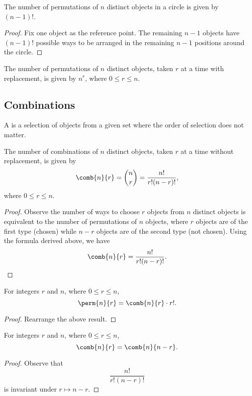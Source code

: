 \begin{proposition}
    The number of permutations of $n$ distinct objects in a circle is given by $(n-1)!$.
\end{proposition}
\begin{proof}
    Fix one object as the reference point. The remaining $n-1$ objects have $(n-1)!$ possible ways to be arranged in the remaining $n-1$ positions around the circle.
\end{proof}

\begin{proposition}
    The number of permutations of $n$ distinct objects, taken $r$ at a time with replacement, is given by $n^r$, where $0 \leq r \leq n$.
\end{proposition}

\subsection{Combinations}

\begin{definition}
    A  is a selection of objects from a given set where the order of selection does not matter.
\end{definition}

\begin{proposition}
    The number of combinations of $n$ distinct objects, taken $r$ at a time without replacement, is given by \[\comb{n}{r} = \binom{n}{r} = \frac{n!}{r! (n-r)!},\] where $0 \leq r \leq n$.
\end{proposition}
\begin{proof}
    Observe the number of ways to choose $r$ objects from $n$ distinct objects is equivalent to the number of permutations of $n$ objects, where $r$ objects are of the first type (chosen) while $n-r$ objects are of the second type (not chosen). Using the formula derived above, we have \[\comb{n}{r} = \frac{n!}{r! (n-r)!}.\]
\end{proof}
\begin{corollary}
    For integers $r$ and $n$, where $0 \leq r \leq n$, \[\perm{n}{r} = \comb{n}{r} \cdot r!.\]
\end{corollary}
\begin{proof}
    Rearrange the above result.
\end{proof}
\begin{corollary}
    For integers $r$ and $n$, where $0 \leq r \leq n$, \[\comb{n}{r} = \comb{n}{n-r}.\]
\end{corollary}
\begin{proof}
    Observe that \[\frac{n!}{r! (n-r)!}\] is invariant under $r \mapsto n - r$.
\end{proof}

